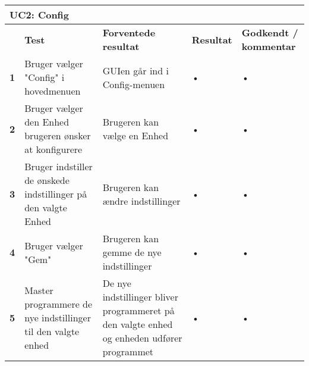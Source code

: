 
\begin{longtable}{|p{5mm}|p{40mm}|p{40mm}|p{20mm}|p{25mm}|}
\hline 
\multicolumn{5}{|l|}{\textbf{UC2: Config}} \\ 
\hline 
& \textbf{Test} & \textbf{Forventede resultat} & \textbf{Resultat} & \textbf{Godkendt / kommentar} \\ 
\hline 
\textbf{1}& Bruger vælger "Config" i hovedmenuen & GUIen går ind i Config-menuen & • & • \\ 
\hline 
\textbf{2}& Bruger vælger den Enhed brugeren ønsker at konfigurere & Brugeren kan vælge en Enhed & • & • \\ 
\hline 
\textbf{3}& Bruger indstiller de ønskede indstillinger på den valgte Enhed & Brugeren kan ændre indstillinger & • & • \\ 
\hline 
\textbf{4}& Bruger vælger "Gem" & Brugeren kan gemme de nye indstillinger & • & • \\ 
\hline 
\textbf{5}& Master programmere de nye indstillinger til den valgte enhed & De nye indstillinger bliver programmeret på den valgte enhed og enheden udfører programmet & • & • \\ 
\hline 
\end{longtable}
